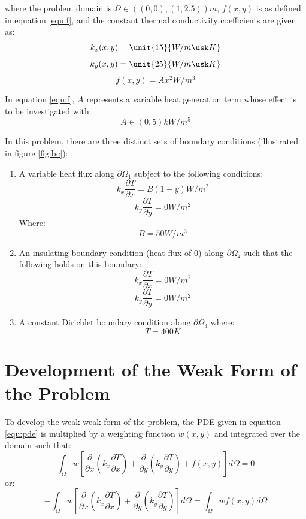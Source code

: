 \documentclass[letterpaper,10pt]{article}
\begin{document}
\noindent where the problem domain is $\Omega \in \unit{\left(\left(0,0\right),\left(1,2.5\right)\right)}{m}$, $f(x,y)$ is as defined in equation \ref{equ:f}, and the constant thermal conductivity coefficients are given as:
\[k_x(x,y)=\unit{15}{W/m\usk K}\]
\[k_y(x,y)=\unit{25}{W/m\usk K}\]
\begin{equation}
\label{equ:f}
f(x,y) = Ax^2 \unit{}{W/m^3}
\end{equation}

\noindent In equation \ref{equ:f}, $A$ represents a variable heat generation term whose effect is to be investigated with:
\[A \in \unit{(0, 5)}{kW/m^5}\]

\noindent In this problem, there are three distinct sets of boundary conditions (illustrated in figure \ref{fig:bc}):
\begin{enumerate}
	\item A variable heat flux along $\partial \Omega_1$ subject to the following conditions:
	\[k_x\frac{\partial T}{\partial x} = B \left(1-y\right) \unit{}{W/m^2}\]
	\[k_y\frac{\partial T}{\partial y} = 0 \unit{}{W/m^2}\]
	Where:
	\[B = \unit{50}{W/m^3}\]
	
	\item An insulating boundary condition (heat flux of 0) along $\partial \Omega_2$ such that the following holds on this boundary:
	\[k_x\frac{\partial T}{\partial x} = 0 \unit{}{W/m^2}\]
	\[k_y\frac{\partial T}{\partial y} = 0 \unit{}{W/m^2}\]
	
	\item A constant Dirichlet boundary condition along $\partial \Omega_3$ where:
	\[T = \unit{400}{K}\]
\end{enumerate}

\section{Development of the Weak Form of the Problem}
To develop the weak weak form of the problem, the PDE given in equation \ref{equ:pde} is multiplied by a weighting function $w(x,y)$ and integrated over the domain such that:
\[\int_\Omega w \left[\frac{\partial}{\partial x}\left(k_x\frac{\partial T}{\partial x}\right) + \frac{\partial}{\partial y}\left(k_y\frac{\partial T}{\partial y}\right) + f(x,y)\right] d\Omega = 0\]
\noindent or:
\begin{equation}
\label{equ:wintpde}
-\int_\Omega w \left[\frac{\partial}{\partial x}\left(k_x\frac{\partial T}{\partial x}\right) + \frac{\partial}{\partial y}\left(k_y\frac{\partial T}{\partial y}\right)\right] d\Omega = \int_\Omega wf(x,y)d\Omega
\end{equation}
\end{document}
